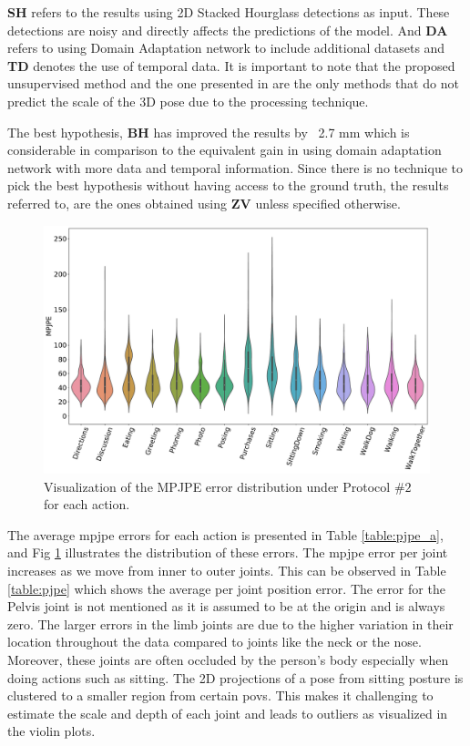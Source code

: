 

\textbf{SH} refers to the results using 2D Stacked Hourglass detections as input. These detections are noisy and directly affects the predictions of the model. And \textbf{DA} refers to using Domain Adaptation network to include additional datasets and \textbf{TD} denotes the use of temporal data. It is important to note that the proposed unsupervised method and the one presented in \cite{amazon1} are the only methods that do not predict the scale of the 3D pose due to the processing technique.



The best hypothesis, \textbf{BH} has improved the results by ~2.7 mm which is considerable in comparison to the equivalent gain in \cite{amazon1} using domain adaptation network with more data and temporal information. Since there is no technique to pick the best hypothesis without having access to the ground truth, the results referred to, are the ones obtained using \textbf{ZV} unless specified otherwise. 

\begin{figure}[h]
    \centering
    \includegraphics[width=\textwidth]{figures/results/violin_pjpe.pdf}
    \caption{Visualization of the MPJPE error distribution under Protocol $\#2$ for each action.}
    \label{fig:mpjpe_trends}
\end{figure}

The average \ac{mpjpe} errors for each action is presented in Table \ref{table:pjpe_a}, and Fig \ref{fig:mpjpe_trends} illustrates the distribution of these errors. The \ac{mpjpe} error per joint increases as we move from inner to outer joints. This can be observed in Table \ref{table:pjpe} which shows the average per joint position error. The error for the Pelvis joint is not mentioned as it is assumed to be at the origin and is always zero. The larger errors in the limb joints are due to the higher variation in their location throughout the data compared to joints like the neck or the nose. Moreover, these joints are often occluded by the person's body especially when doing actions such as sitting. The 2D projections of a pose from sitting posture is clustered to a smaller region from certain \acp{pov}. This makes it challenging to estimate the scale and depth of each joint and leads to outliers as visualized in the violin plots.

